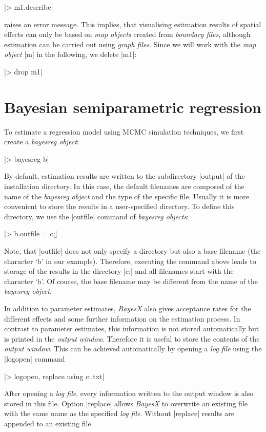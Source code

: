 |> m1.describe|

raises an error message. This implies, that visualising estimation results of spatial effects can only be based on {\it map
objects} created from {\it boundary files}, although estimation can be carried out using {\it graph files}. Since we will work
with the {\it map object} |m| in the following, we delete |m1|:

|> drop m1|

\section{Bayesian semiparametric regression}\label{mcmc:regression}

To estimate a regression model using MCMC simulation techniques, we first create a {\it bayesreg object}:

|> bayesreg b|

By default, estimation results are written to the subdirectory |output| of the installation directory. In this case, the
default filenames are composed of the name of the {\it bayesreg object} and the type of the specific file. Usually it is more
convenient to store the results in a user-specified directory. To define this directory, we use the |outfile| command of {\it
bayesreg objects}:

|> b.outfile = c:\data\b|

Note, that |outfile| does not only specify a directory but also a base filename (the character `b' in our example). Therefore,
executing the command above leads to storage of the results in the directory |c:\data| and all filenames start with the
character `b'. Of course, the base filename may be different from the name of the {\it bayesreg object}.

In addition to parameter estimates, {\it BayesX} also gives acceptance rates for the different effects and some further
information on the estimation process. In contrast to parameter estimates, this information is not stored automatically but is
printed in the {\it output window}. Therefore it is useful to store the contents of the {\it output window}. This can be
achieved automatically by opening a {\it log file} using the |logopen| command

|> logopen, replace using c:\data\logmcmc.txt|

After opening a {\it log file}, every information written to the output window is also stored in this file. Option |replace|
allows {\it BayesX} to overwrite an existing file with the same name as the specified {\it log file}. Without |replace| results
are appended to an existing file.

